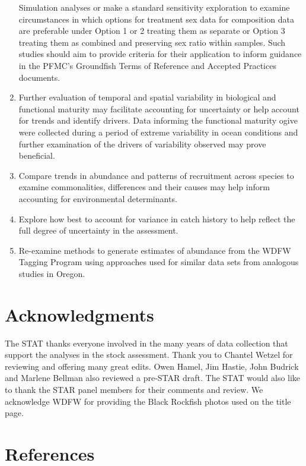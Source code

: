 \documentclass[11pt,
  english,
  letterpaper,
]{article}
\begin{document}
\begin{enumerate}
  Simulation analyses or make a standard sensitivity exploration to examine circumstances in which options for treatment sex data for composition data are preferable under Option 1 or 2 treating them as separate or Option 3 treating them as combined and preserving sex ratio within samples. Such studies should aim to provide criteria for their application to inform guidance in the PFMC's Groundfish Terms of Reference and Accepted Practices documents.
\item
  Further evaluation of temporal and spatial variability in biological and functional maturity may facilitate accounting for uncertainty or help account for trends and identify drivers. Data informing the functional maturity ogive were collected during a period of extreme variability in ocean conditions and further examination of the drivers of variability observed may prove beneficial.
\item
  Compare trends in abundance and patterns of recruitment across species to examine commonalities, differences and their causes may help inform accounting for environmental determinants.
\item
  Explore how best to account for variance in catch history to help reflect the full degree of uncertainty in the assessment.
\item
  Re-examine methods to generate estimates of abundance from the WDFW Tagging Program using approaches used for similar data sets from analogous studies in Oregon.
\end{enumerate}

\hypertarget{acknowledgments}{%
\section{Acknowledgments}\label{acknowledgments}}

The STAT thanks everyone involved in the many years of data collection that support the analyses in the stock assessment. Thank you to Chantel Wetzel for reviewing and offering many great edits. Owen Hamel, Jim Hastie, John Budrick and Marlene Bellman also reviewed a pre-STAR draft. The STAT would also like to thank the STAR panel members for their comments and review. We acknowledge WDFW for providing the Black Rockfish photos used on the title page.

\clearpage

\hypertarget{references}{%
\section{References}\label{references}}
\end{document}

